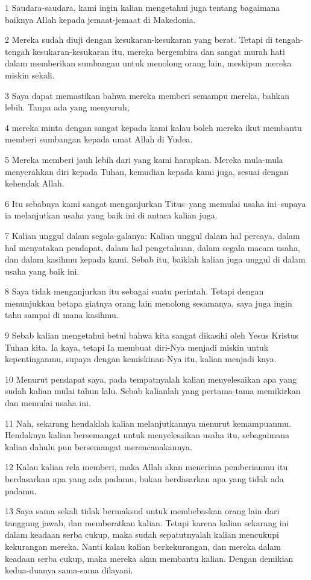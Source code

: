 \par 1 Saudara-saudara, kami ingin kalian mengetahui juga tentang bagaimana baiknya Allah kepada jemaat-jemaat di Makedonia.
\par 2 Mereka sudah diuji dengan kesukaran-kesukaran yang berat. Tetapi di tengah-tengah kesukaran-kesukaran itu, mereka bergembira dan sangat murah hati dalam memberikan sumbangan untuk menolong orang lain, meskipun mereka miskin sekali.
\par 3 Saya dapat memastikan bahwa mereka memberi semampu mereka, bahkan lebih. Tanpa ada yang menyuruh,
\par 4 mereka minta dengan sangat kepada kami kalau boleh mereka ikut membantu memberi sumbangan kepada umat Allah di Yudea.
\par 5 Mereka memberi jauh lebih dari yang kami harapkan. Mereka mula-mula menyerahkan diri kepada Tuhan, kemudian kepada kami juga, sesuai dengan kehendak Allah.
\par 6 Itu sebabnya kami sangat menganjurkan Titus--yang memulai usaha ini--supaya ia melanjutkan usaha yang baik ini di antara kalian juga.
\par 7 Kalian unggul dalam segala-galanya: Kalian unggul dalam hal percaya, dalam hal menyatakan pendapat, dalam hal pengetahuan, dalam segala macam usaha, dan dalam kasihmu kepada kami. Sebab itu, baiklah kalian juga unggul di dalam usaha yang baik ini.
\par 8 Saya tidak menganjurkan itu sebagai suatu perintah. Tetapi dengan menunjukkan betapa giatnya orang lain menolong sesamanya, saya juga ingin tahu sampai di mana kasihmu.
\par 9 Sebab kalian mengetahui betul bahwa kita sangat dikasihi oleh Yesus Kristus Tuhan kita. Ia kaya, tetapi Ia membuat diri-Nya menjadi miskin untuk kepentinganmu, supaya dengan kemiskinan-Nya itu, kalian menjadi kaya.
\par 10 Menurut pendapat saya, pada tempatnyalah kalian menyelesaikan apa yang sudah kalian mulai tahun lalu. Sebab kalianlah yang pertama-tama memikirkan dan memulai usaha ini.
\par 11 Nah, sekarang hendaklah kalian melanjutkannya menurut kemampuanmu. Hendaknya kalian bersemangat untuk menyelesaikan usaha itu, sebagaimana kalian dahulu pun bersemangat merencanakannya.
\par 12 Kalau kalian rela memberi, maka Allah akan menerima pemberianmu itu berdasarkan apa yang ada padamu, bukan berdasarkan apa yang tidak ada padamu.
\par 13 Saya sama sekali tidak bermaksud untuk membebaskan orang lain dari tanggung jawab, dan memberatkan kalian. Tetapi karena kalian sekarang ini dalam keadaan serba cukup, maka sudah sepatutnyalah kalian mencukupi kekurangan mereka. Nanti kalau kalian berkekurangan, dan mereka dalam keadaan serba cukup, maka mereka akan membantu kalian. Dengan demikian kedua-duanya sama-sama dilayani.
